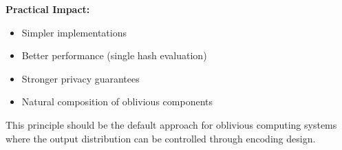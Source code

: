 \documentclass[11pt,final]{article}
\begin{document}
\textbf{Practical Impact:}
\begin{itemize}
    \item Simpler implementations
    \item Better performance (single hash evaluation)
    \item Stronger privacy guarantees
    \item Natural composition of oblivious components
\end{itemize}

This principle should be the default approach for oblivious computing systems where the output distribution can be controlled through encoding design.


\end{document}
